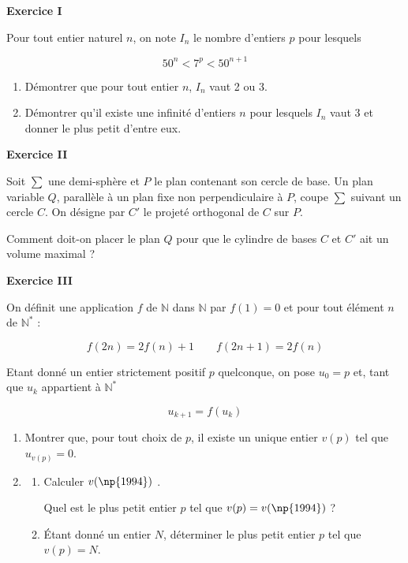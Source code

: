 \documentclass[a4paper,11pt]{article}
\newcommand{\N}{\mathbb{N}}
\begin{document}
\begin{center}\textbf{{\color{blue} Exercice I}}
\end{center}

Pour tout entier naturel $n$, on note $I_n$ le nombre d'entiers $p$ pour lesquels

\[50^n < 7^p < 50^{n+1}\]

\smallskip

\begin{enumerate}
\item Démontrer que pour tout entier $n$, \:$I_n$ vaut 2 ou 3.
\item Démontrer qu'il existe une infinité d'entiers $n$ pour lesquels $I_n$ vaut 3 et donner le plus petit d'entre eux.
\end{enumerate}

\begin{center}\textbf{{\color{blue} Exercice II}}
\end{center}

Soit $\sum$ une demi-sphère et $P$ le plan contenant son cercle de base. Un plan variable $Q$, parallèle à un plan fixe non perpendiculaire à $P$, coupe $\sum$ suivant un cercle $C$. On désigne par $C'$ le projeté orthogonal de $C$ sur $P$.

Comment doit-on placer le plan $Q$ pour que le cylindre de bases $C$ et $C'$ ait un volume maximal ?

\begin{center}\textbf{{\color{blue} Exercice III}}
\end{center}

On définit une application $f$ de $\N$ dans $\N$ par $f(1) = 0$ et pour tout élément $n$ de $\N^{*}$  :

\[f(2n) = 2f(n) + 1 \qquad  f(2n+1) = 2f(n)\]

Etant donné un entier strictement positif $p$ quelconque, on pose $u_0 = p$ et, tant que $u_k$ appartient à $\N^{*}$

\[u_{k+1} = f\left(u_k\right)\]

\medskip

\begin{enumerate}
\item Montrer que, pour tout choix de $p$, il existe un unique entier $v(p)$ tel que $u_{v(p)} = 0$.
\item 
	\begin{enumerate}
		\item Calculer $v(\np{1994})$ .
		
Quel est le plus petit entier $p$ tel que $v(p) = v(\np{1994})$ ?
		\item Étant donné un entier $N$, déterminer le plus petit entier $p$ tel que $v(p) = N$.
	\end{enumerate}
\end{enumerate}
\end{document}
